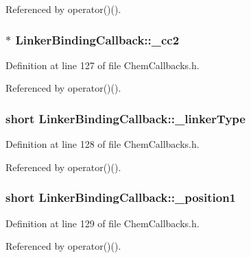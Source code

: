 Referenced by operator()().

\hypertarget{structLinkerBindingCallback_af2d636fe16154ebae3692ad236aaa688}{
\subsubsection[{\+\_\+cc2}]{ $\ast$ Linker\+Binding\+Callback\+::\+\_\+cc2}}\label{structLinkerBindingCallback_af2d636fe16154ebae3692ad236aaa688}


Definition at line 127 of file Chem\+Callbacks.\+h.



Referenced by operator()().

\hypertarget{structLinkerBindingCallback_a212f01f0cbdd2fe059d54b72eccc1efa}{
\subsubsection[{\+\_\+linker\+Type}]{\setlength{\rightskip}{0pt plus 5cm}short Linker\+Binding\+Callback\+::\+\_\+linker\+Type}}\label{structLinkerBindingCallback_a212f01f0cbdd2fe059d54b72eccc1efa}


Definition at line 128 of file Chem\+Callbacks.\+h.



Referenced by operator()().

\hypertarget{structLinkerBindingCallback_a09568aaf424fbaa0b06957aa8de1231b}{
\subsubsection[{\+\_\+position1}]{\setlength{\rightskip}{0pt plus 5cm}short Linker\+Binding\+Callback\+::\+\_\+position1}}\label{structLinkerBindingCallback_a09568aaf424fbaa0b06957aa8de1231b}


Definition at line 129 of file Chem\+Callbacks.\+h.



Referenced by operator()().


